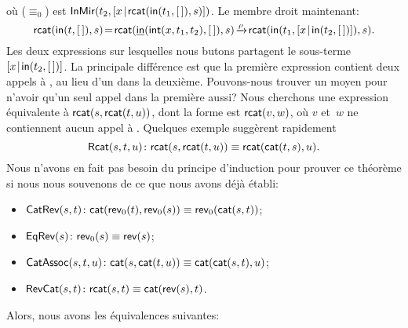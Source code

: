 où (\(\equiv_0\)) est
\(\textsf{InMir}({t_2,[{x}\!\mid\!{\textsf{rcat}(\textsf{in}(t_1,[\,]),s)}]})\).
Le membre droit maintenant:
\begin{equation*}
\textsf{rcat}(\textsf{in}(t,[\,]),s)
\! = \!
 \textsf{rcat}(\underline{\textsf{in}}(\textsf{int}(x,t_1,t_2),[\,]),s)
\! \xrightarrow{\smash{\rho}}\!
 \textsf{rcat}(\textsf{in}(t_1,[{x}\!\mid\!{\textsf{in}(t_2,[\,])}]),s).
\end{equation*}
Les deux expressions sur lesquelles nous butons partagent le
sous-terme \([{x}\!\mid\!{\textsf{in}(t_2,[\,])}]\). La
principale différence est que la première expression contient deux
appels à , au lieu d'un dans la
deuxième. Pouvons-nous trouver un moyen pour n'avoir qu'un seul appel
dans la première aussi? Nous cherchons une expression équivalente à
\(\textsf{rcat}(s,\textsf{rcat}(t,u))\), dont la forme est
\(\textsf{rcat}(v,w)\), où \(v\) et~\(w\) ne contiennent aucun appel à
. Quelques exemple suggèrent
rapidement
\begin{equation*}
  \textsf{Rcat}({s,t,u}) \colon \textsf{rcat}(s,\textsf{rcat}(t,u)) \equiv \textsf{rcat}(\textsf{cat}(t,s),u).
\end{equation*}
Nous n'avons en fait pas besoin du principe d'induction pour prouver
ce théorème si nous nous souvenons de ce que nous avons déjà établi:
\begin{itemize}

  \item \(\textsf{CatRev}({s,t}) \colon \textsf{cat}(\textsf{rev}_0(t),
    \textsf{rev}_0(s)) \equiv \textsf{rev}_0(\textsf{cat}(s,t))\);

  \item \(\textsf{EqRev}({s}) \colon \textsf{rev}_0(s) \equiv \textsf{rev}(s)\);

  \item \(\textsf{CatAssoc}({s,t,u}) \colon \textsf{cat}(s,\textsf{cat}(t,u))
    \equiv \textsf{cat}(\textsf{cat}(s,t),u)\);

  \item \(\textsf{RevCat}({s,t}) \colon \textsf{rcat}(s,t) \equiv
    \textsf{cat}(\textsf{rev}(s),t)\).

\end{itemize}
Alors, nous avons les équivalences suivantes:
